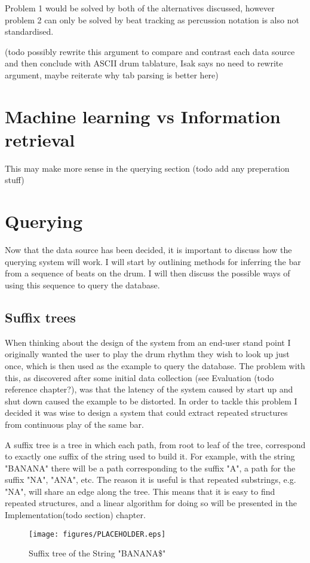 \documentclass[12pt,twoside,notitlepage]{report}
\begin{document}
		Problem 1 would be solved by both of the alternatives discussed, however problem 2 can only be solved by beat tracking as percussion notation is also not standardised. 
		
		(todo possibly rewrite this argument to compare and contrast each data source and then conclude with ASCII drum tablature, Isak says no need to rewrite argument, maybe reiterate why tab parsing is better here)
		
		
		
	\section{Machine learning vs Information retrieval}
	This may make more sense in the querying section (todo add any preperation stuff)
	\section{Querying}
	Now that the data source has been decided, it is important to discuss how the querying system will work. I will start by outlining methods for inferring the bar from a sequence of beats on the drum. I will then discuss the possible ways of using this sequence to query the database.
	

		\subsection{\label{subsec:PrepSuffix}Suffix trees}
		
		When thinking about the design of the system from an end-user stand point I originally wanted the user to play the drum rhythm they wish to look up just once, which is then used as the example to query the database. The problem with this, as discovered after some initial data collection (see Evaluation (todo reference chapter?), was that the latency of the system caused by start up and shut down caused the example to be distorted. In order to tackle this problem I decided it was wise to design a system that could extract repeated structures from continuous play of the same bar.
		
		A suffix tree\cite{Weiner1973} is a tree in which each path, from root to leaf of the tree, correspond to exactly one suffix of the string used to build it. For example, with the string "BANANA" there will be a path corresponding to the suffix "A", a path for the suffix "NA", "ANA", etc. The reason it is useful is that repeated substrings, e.g. "NA", will share an edge along the tree. This means that it is easy to find repeated structures, and a linear algorithm\cite{Gusfield1999} for doing so will be presented in the Implementation(todo section) chapter.		
\begin{figure}[h]
			\centerline{\texttt{[image: figures/PLACEHOLDER.eps]}}
			\caption{\label{SuffixTree} Suffix tree of the String "BANANA\$"}
\end{figure}
		
\end{document}
